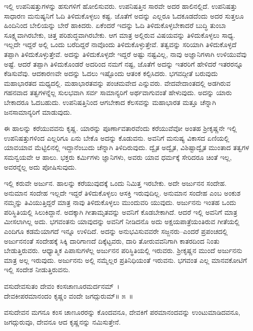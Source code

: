 ಇಲ್ಲಿ ಉಪನಿಷತ್ತುಗಳನ್ನು ಹಸುಗಳಿಗೆ ಹೋಲಿಸುವರು. ಉಪನಿಷತ್ತಿನ ಸಾರವೇ ಅದರ ಹಾಲಿನಲ್ಲಿದೆ. ಉಪನಿಷತ್ತು ಸಾಧಾರಣ ಮನುಷ್ಯನಿಗೆ ಓದಿ ತಿಳಿದುಕೊಳ್ಳಲು ಕಷ್ಟ. ಜೊತೆಗೆ ಅದನ್ನು ಎಲ್ಲರೂ ಓದಕೂಡದೆಂದು ಅದರ ಸುತ್ತಲೂ ಹಿಂದಿನಿಂದ ಬೇಲಿಯನ್ನು ಬೇರೆ ಹಾಕಿದರು. ಏಕೆಂದರೆ ಇದನ್ನು ಓದಿ ತಿಳಿದುಕೊಳ್ಳಬೇಕಾದರೆ ಬುದ್ಧಿ ತುಂಬಾ ಸೂಕ್ಷ್ಮವಾಗಿರಬೇಕು, ಚಿತ್ತ ಪರಿಶುದ್ಧವಾಗಿರಬೇಕು. ಆಗ ಮಾತ್ರ ಅಲ್ಲಿರುವ ವಿಷಯವನ್ನು ತಿಳಿದುಕೊಳ್ಳಲು ಸಾಧ್ಯ. ಇಲ್ಲದೇ ಇದ್ದರೆ ಅಲ್ಲಿ ಒಂದು ಬರೆದಿದ್ದರೆ ನಾವೊಂದು ತಿಳಿದುಕೊಳ್ಳುತ್ತೇವೆ. ತತ್ವವನ್ನು ಸರಿಯಾಗಿ ತಿಳಿದುಕೊಳ್ಳದೆ ತಪ್ಪಾಗಿ ತಿಳಿದುಕೊಳ್ಳುತ್ತೇವೆ. ಅದನ್ನು ತಿಳಿದುಕೊಳ್ಳದೇ ಇದ್ದರೆ ಅಷ್ಟು ನಷ್ಟವಿಲ್ಲ, ನಾವು ಅಜ್ಞಾನಿಗಳಾಗಿ ಉಳಿಯುವೆವು ಅಷ್ಟೆ. ಆದರೆ ತಪ್ಪಾಗಿ ತಿಳಿದುಕೊಂಡರೆ ಅದರಿಂದ ನಮಗೆ ನಷ್ಟ, ಜೊತೆಗೆ ಅದನ್ನು ಇತರರಿಗೆ ಹೇಳಿದರೆ ಇತರರನ್ನೂ ಕೆಡಿಸುವೆವು. ಆದಕಾರಣವೇ ಅದನ್ನು ಓದಲು ಇಷ್ಟೊಂದು ಆತಂಕ ಕಲ್ಪಿಸಿದರು. ಭಗವದ್ಗೀತೆ ಬರುವುದು ಮಹಾಭಾರತದ ಮಧ್ಯದಲ್ಲಿ. ಮಹಾಭಾರತವನ್ನು ಪಂಚಮವೇದ ಎನ್ನುವರು. ವೇದವೇದಾಂತದಲ್ಲಿ ಅಡಗಿರುವ ಗಹನವಾದ ತತ್ವಗಳನ್ನೆಲ್ಲ ಸುಲಭವಾಗಿ ಸರ್ವ ಸಾಮಾನ್ಯರಿಗೆ ಅರ್ಥವಾಗುವಂತೆ ಹೇಳುವುದು. ಅದನ್ನು ಯಾರು ಬೇಕಾದರೂ ಓದಬಹುದು. ಉಪನಿಷತ್ತಿನಿಂದ ಆಗಬೇಕಾದ ಕೆಲಸವನ್ನು ಮಹಾಭಾರತ ಮತ್ತೂ ಚೆನ್ನಾಗಿ ಜನಸಾಮಾನ್ಯರಿಗೆ ಮಾಡುವುದು.

ಈ ಹಾಲನ್ನು ಕರೆಯುವವನು ಕೃಷ್ಣ. ಯಾರನ್ನು ಪೂರ್ಣಾವತಾರವೆಂದು ಕರೆಯುವೆವೋ ಅಂತಹ ಶ‍್ರೀಕೃಷ್ಣನೇ ಇಲ್ಲಿ ಉಪನಿಷತ್ತುಗಳಿಂದ ಎಲ್ಲರಿಗೂ ಏನು ಬೇಕೊ ಅದನ್ನು ಕೊಡುವನು. ಅವನಿಗೆ ಮನುಷ್ಯ ವಿಕಾಸದ ಏಣಿಯಲ್ಲಿ ಯಾವಯಾವ ಮೆಟ್ಟಿಲಿನಲ್ಲಿ ಇದ್ದಾನೆಂಬುದು ಚೆನ್ನಾಗಿ ತಿಳಿದಿರುವುದು. ದ್ವೈತ ಅದ್ವೈತ, ವಿಶಿಷ್ಟಾದ್ವೈತ ಮುಂತಾದ ತತ್ವಗಳ ಸಮನ್ವಯವೇ ಆ ಹಾಲು. ಭಕ್ತರು ಕರ್ಮಿಗಳು ಜ್ಞಾನಿಗಳು, ಅವರು ಯಾವ ಧರ್ಮಕ್ಕೆ ಸೇರಿದರೂ ಚಿಂತೆ ಇಲ್ಲ, ಅವರನ್ನೆಲ್ಲ ಅದು ಪೋಷಿಸುವುದು.

ಇಲ್ಲಿ ಕರುವೇ ಅರ್ಜುನ. ಹಾಲನ್ನು ಕರೆಯುವುದಕ್ಕೆ ಒಂದು ನಿಮಿತ್ತ ಇರಬೇಕು. ಅದೇ ಅರ್ಜುನನ ಸಂದೇಹ. ಅನುಮಾನ ಸಂದೇಹ ಇಲ್ಲದೇ ಇದ್ದರೆ ತಿಳಿದುಕೊಳ್ಳಲು ಆಸಕ್ತಿ ಇರುವುದಿಲ್ಲ. ಅನುಮಾನ ಸಂದೇಹ ಎಂಬ ಅಂಕುಶ ನಮ್ಮನ್ನು ತಿವಿಯುತ್ತಿದ್ದರೆ ಮಾತ್ರ ನಾವು ತಿಳಿದುಕೊಳ್ಳಲು ಮುಂದುವರಿ ಯುವುದು. ಅರ್ಜುನನು ಇಂತಹ ಒಂದು ಪರಿಸ್ಥಿತಿಯಲ್ಲಿ ಸಿಲುಕಿದ್ದಾನೆ. ಅದಕ್ಕಾಗಿ ಗೀತಾಮೃತವನ್ನು ಅವನಿಗೆ ಕೊಡಬೇಕಾಗಿದೆ. ಆದರೆ ಇಲ್ಲಿ ಅವನಿಗೆ ಮಾತ್ರ ಮೀಸಲಾಗಿಲ್ಲ ಅದು. ಭಗವಂತನು ಯಾವುದನ್ನು ಅವನಿಗೆ ನೀಡಿದನೊ ಅದು ಅಕ್ಷಯಪಾತ್ರೆಯಂತಿರುವ ಗೀತೆಯಲ್ಲಿ ಎಂದಿಗೂ ಕಡಮೆಯಾಗದೆ ಇನ್ನೂ ಉಳಿದಿದೆ. ಅದನ್ನು ಅನುಭವಿಸುವವರೇ ಸಜ್ಜನರು–ಎಂದರೆ ಪ್ರಪಂಚದಲ್ಲಿ ಅರ್ಜುನನಂತೆ ಸಂದೇಹಕ್ಕೆ ಸಿಕ್ಕಿ ದಾರಿ\-ಗಾಣದೆ ದಿಕ್ಕೆಟ್ಟವರು, ದಾರಿ ತೋರುವವನಿಗಾಗಿ ಕಾತರದಿಂದ ನಿಂತು ಬೇಡುತ್ತಿರುವರು. ಆಧ್ಯಾತ್ಮಿಕ ಪಿಪಾಸುಗಳೆಲ್ಲ ಅರ್ಜುನನ ಪರಿಸ್ಥಿತಿಯಲ್ಲಿ ಇರುವರು. ಶ‍್ರೀಕೃಷ್ಣನ ಮುಂದೆ ಅರ್ಜುನನು ಮಾತ್ರ ಅಲ್ಲ ಇರುವುದು. ಅರ್ಜುನನು ಅಲ್ಲಿ ನಮ್ಮೆಲ್ಲರ ಪ್ರತಿನಿಧಿಯಂತೆ ಇರುವನು. ಭಗವಂತ ಎಲ್ಲ ಮಾನವಕೋಟಿಗೆ ಇಲ್ಲಿ ಸಂದೇಶ ನೀಡುತ್ತಿರುವನು.

\begin{shloka}
ವಸುದೇವಸುತಂ ದೇವಂ ಕಂಸಚಾಣೂರಮರ್ದನಮ್~।\\ದೇವಕೀಪರಮಾನಂದಂ ಕೃಷ್ಣಂ ವಂದೇ ಜಗದ್ಗುರುಮ್\hfill॥ ೫~॥
\end{shloka}

\begin{artha}
ವಸುದೇವನ ಮಗನೂ ಕಂಸ ಚಾಣೂರರನ್ನು ಕೊಂದವನೂ, ದೇವಕಿಗೆ ಪರಮಾನಂದವನ್ನು ಉಂಟುಮಾಡಿ\-ದವನೂ, ಜಗದ್ಗುರುವೂ, ದೇವನೂ ಆದ ಕೃಷ್ಣನನ್ನು ನಮಿಸುತ್ತೇನೆ.
\end{artha}

